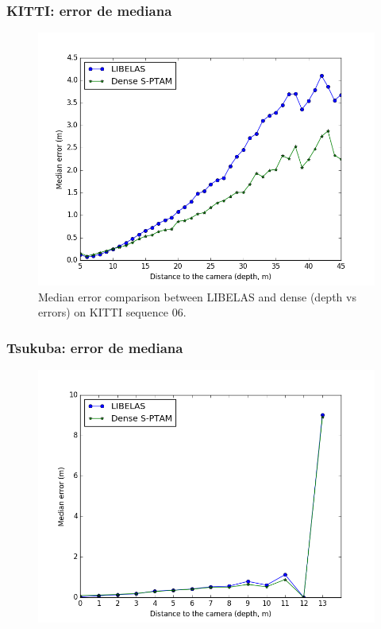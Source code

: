 \documentclass[compress]{beamer}
\begin{document}
\begin{frame}
	\frametitle{KITTI: error de mediana}
	\begin{figure}[!htb]
		\centering
		\includegraphics[width=0.8\columnwidth]{images/medians_comparison_kitti}
		\caption{Median error comparison between LIBELAS and dense (depth vs errors) on KITTI sequence 06.}
		\label{fig:median_comparison_kitti}
	\end{figure}
\end{frame}


\begin{frame}
	\frametitle{Tsukuba: error de mediana}
	\begin{figure}[!htb]
		\centering
		\includegraphics[width=0.8\columnwidth]{images/medians_comparison_tsukuba}
		\label{fig:median_comparison_tsukuba}
	\end{figure}
\end{frame}
\end{document}
